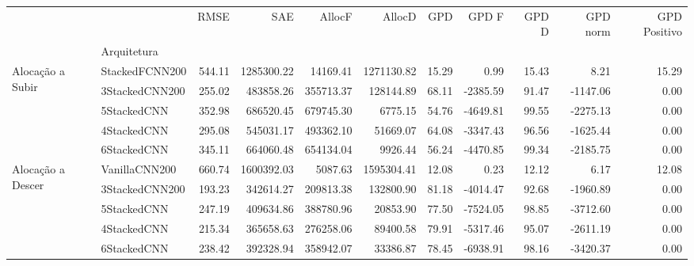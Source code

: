 \begin{tabular}{llrrrrrrrrr}
\toprule
 &  & RMSE & SAE & AllocF & AllocD & GPD & GPD F & GPD D & GPD norm & GPD Positivo \\
 & Arquitetura &  &  &  &  &  &  &  &  &  \\
\midrule
\multirow[t]{5}{*}{Alocação a Subir} & StackedFCNN200 & 544.11 & 1285300.22 & 14169.41 & 1271130.82 & 15.29 & 0.99 & 15.43 & 8.21 & 15.29 \\
 & 3StackedCNN200 & 255.02 & 483858.26 & 355713.37 & 128144.89 & 68.11 & -2385.59 & 91.47 & -1147.06 & 0.00 \\
 & 5StackedCNN & 352.98 & 686520.45 & 679745.30 & 6775.15 & 54.76 & -4649.81 & 99.55 & -2275.13 & 0.00 \\
 & 4StackedCNN & 295.08 & 545031.17 & 493362.10 & 51669.07 & 64.08 & -3347.43 & 96.56 & -1625.44 & 0.00 \\
 & 6StackedCNN & 345.11 & 664060.48 & 654134.04 & 9926.44 & 56.24 & -4470.85 & 99.34 & -2185.75 & 0.00 \\
\cline{1-11}
\multirow[t]{5}{*}{Alocação a Descer} & VanillaCNN200 & 660.74 & 1600392.03 & 5087.63 & 1595304.41 & 12.08 & 0.23 & 12.12 & 6.17 & 12.08 \\
 & 3StackedCNN200 & 193.23 & 342614.27 & 209813.38 & 132800.90 & 81.18 & -4014.47 & 92.68 & -1960.89 & 0.00 \\
 & 5StackedCNN & 247.19 & 409634.86 & 388780.96 & 20853.90 & 77.50 & -7524.05 & 98.85 & -3712.60 & 0.00 \\
 & 4StackedCNN & 215.34 & 365658.63 & 276258.06 & 89400.58 & 79.91 & -5317.46 & 95.07 & -2611.19 & 0.00 \\
 & 6StackedCNN & 238.42 & 392328.94 & 358942.07 & 33386.87 & 78.45 & -6938.91 & 98.16 & -3420.37 & 0.00 \\
\cline{1-11}
\bottomrule
\end{tabular}

